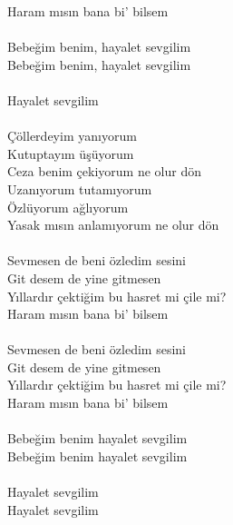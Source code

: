 \documentclass{proc}
\begin{document}
Haram m{\i}s{\i}n bana bi' bilsem\\
\\
Bebe\u{g}im benim, hayalet sevgilim\\
Bebe\u{g}im benim, hayalet sevgilim\\
\\
Hayalet sevgilim\\
\\
\c{C}\"{o}llerdeyim yan{\i}yorum\\
Kutuptay{\i}m \"{u}ş\"{u}yorum\\
Ceza benim \c{c}ekiyorum ne olur d\"{o}n\\
Uzan{\i}yorum tutam{\i}yorum\\
\"{O}zl\"{u}yorum a\u{g}l{\i}yorum\\
Yasak m{\i}s{\i}n anlam{\i}yorum ne olur d\"{o}n\\
\\
Sevmesen de beni \"{o}zledim sesini\\
Git desem de yine gitmesen\\
Y{\i}llard{\i}r \c{c}ekti\u{g}im bu hasret mi \c{c}ile mi?\\
Haram m{\i}s{\i}n bana bi' bilsem\\
\\
Sevmesen de beni \"{o}zledim sesini\\
Git desem de yine gitmesen\\
Y{\i}llard{\i}r \c{c}ekti\u{g}im bu hasret mi \c{c}ile mi?\\
Haram m{\i}s{\i}n bana bi' bilsem\\
\\
Bebe\u{g}im benim hayalet sevgilim\\
Bebe\u{g}im benim hayalet sevgilim\\
\\
Hayalet sevgilim\\
Hayalet sevgilim\\
\end{document}

